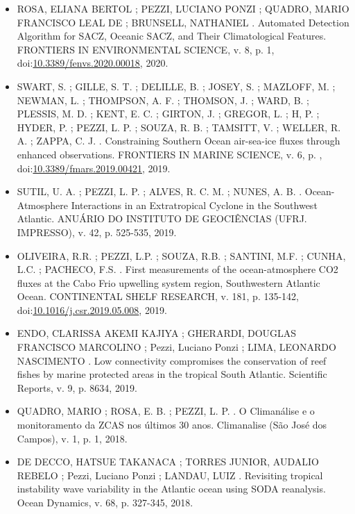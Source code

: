 \documentclass[11pt, a4paper]{awesome-cv}
\begin{document}
\begin{cvletter}
\begin{itemize}
  \item[] ROSA, ELIANA BERTOL ; PEZZI, LUCIANO PONZI ; QUADRO, MARIO FRANCISCO LEAL DE ; BRUNSELL, 
  NATHANIEL . Automated Detection Algorithm for SACZ, Oceanic SACZ, and Their Climatological Features. 
  FRONTIERS IN ENVIRONMENTAL SCIENCE, v. 8, p. 1, 
  doi:\textcolor{bleu_cite}{\href{http://dx.doi.org/10.3389/fenvs.2020.00018}{10.3389/fenvs.2020.00018}}, 2020. 

  \item[] SWART, S. ; GILLE, S. T. ; DELILLE, B. ; JOSEY, S. ; MAZLOFF, M. ; NEWMAN, L. ; THOMPSON, A. F. ; 
  THOMSON, J. ; WARD, B. ; PLESSIS, M. D. ; KENT, E. C. ; GIRTON, J. ; GREGOR, L. ; H, P. ; HYDER, P. ; 
  PEZZI, L. P. ; SOUZA, R. B. ; TAMSITT, V. ; WELLER, R. A. ; ZAPPA, C. J. . Constraining Southern 
  Ocean air-sea-ice fluxes through enhanced observations. FRONTIERS IN MARINE SCIENCE, v. 6, p. ,
  doi:\textcolor{bleu_cite}{\href{https://doi.org/10.3389/fmars.2019.00421}{10.3389/fmars.2019.00421}}, 2019. 

  \item[] SUTIL, U. A. ; PEZZI, L. P. ; ALVES, R. C. M. ; NUNES, A. B. . 
  Ocean-Atmosphere Interactions in an Extratropical Cyclone in the Southwest Atlantic. 
  ANUÁRIO DO INSTITUTO DE GEOCIÊNCIAS (UFRJ. IMPRESSO), v. 42, p. 525-535, 
  2019. 

  \item[] OLIVEIRA, R.R. ; PEZZI, L.P. ; SOUZA, R.B. ; SANTINI, M.F. ; CUNHA, L.C. ; PACHECO, F.S. . 
  First measurements of the ocean-atmosphere CO2 fluxes at the Cabo Frio upwelling system region, 
  Southwestern Atlantic Ocean. CONTINENTAL SHELF RESEARCH, v. 181, p. 135-142,
  doi:\textcolor{bleu_cite}{\href{https://doi.org/10.1016/j.csr.2019.05.008}{10.1016/j.csr.2019.05.008}}, 2019. 
   

  \item[] ENDO, CLARISSA AKEMI KAJIYA ; GHERARDI, DOUGLAS FRANCISCO MARCOLINO ; Pezzi, Luciano Ponzi 
  ; LIMA, LEONARDO NASCIMENTO . Low connectivity compromises the conservation of reef fishes by 
  marine protected areas in the tropical South Atlantic. Scientific Reports, v. 9, p. 8634, 
  2019.

  \item[] QUADRO, MARIO ; ROSA, E. B. ; PEZZI, L. P. . O Climanálise e o monitoramento da ZCAS nos 
  últimos 30 anos. Climanalise (São José dos Campos), v. 1, p. 1, 2018. 

  \item[] DE DECCO, HATSUE TAKANACA ; TORRES JUNIOR, AUDALIO REBELO ; Pezzi, Luciano Ponzi ; 
  LANDAU, LUIZ . Revisiting tropical instability wave variability in the Atlantic ocean using 
  SODA reanalysis. Ocean Dynamics, v. 68, p. 327-345, 
  2018.


\end{itemize}
\end{cvletter}
\end{document}
